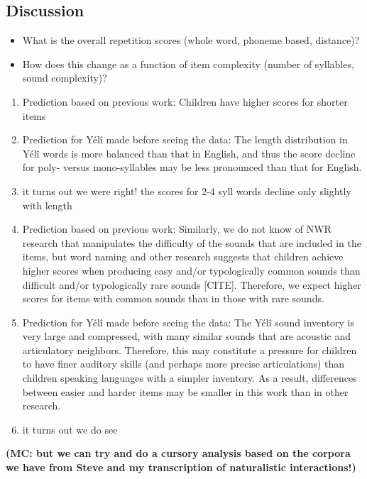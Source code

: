 \documentclass[english,,man,floatsintext]{apa6}
\begin{document}
\subsection{Discussion}\label{discussion}

\begin{itemize}
\item
  What is the overall repetition scores (whole word, phoneme based,
  distance)?
\item
  How does this change as a function of item complexity (number of
  syllables, sound complexity)?
\end{itemize}

\begin{enumerate}
\def\labelenumi{\arabic{enumi}.}
\item
  Prediction based on previous work: Children have higher scores for
  shorter items
\item
  Prediction for Yélî made before seeing the data: The length
  distribution in Yélî words is more balanced than that in English, and
  thus the score decline for poly- versus mono-syllables may be less
  pronounced than that for English.
\item
  it turns out we were right! the scores for 2-4 syll words decline only
  slightly with length
\item
  Prediction based on previous work: Similarly, we do not know of NWR
  research that manipulates the difficulty of the sounds that are
  included in the items, but word naming and other research suggests
  that children achieve higher scores when producing easy and/or
  typologically common sounds than difficult and/or typologically rare
  sounds {[}CITE{]}. Therefore, we expect higher scores for items with
  common sounds than in those with rare sounds.
\item
  Prediction for Yélî made before seeing the data: The Yélî sound
  inventory is very large and compressed, with many similar sounds that
  are acoustic and articulatory neighbors. Therefore, this may
  constitute a pressure for children to have finer auditory skills (and
  perhaps more precise articulations) than children speaking languages
  with a simpler inventory. As a result, differences between easier and
  harder items may be smaller in this work than in other research.
\item
  it turns out we do see
\end{enumerate}

\textbf{(MC: but we can try and do a cursory analysis based on the
corpora we have from Steve and my transcription of naturalistic
interactions!)}
\end{document}
